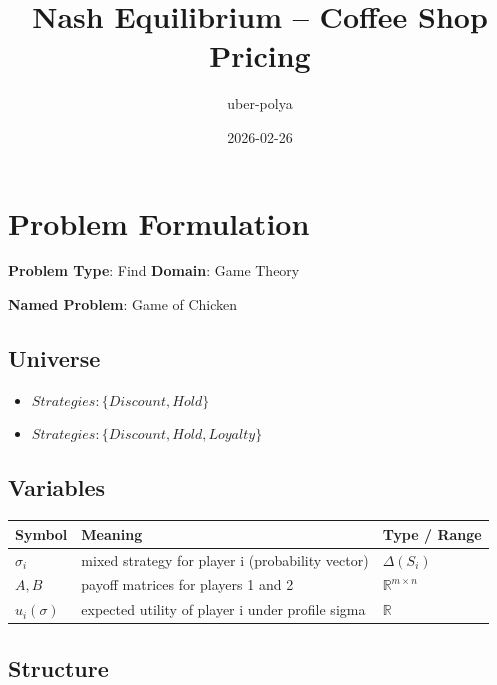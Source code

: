 \documentclass[11pt, a4paper]{article}
\title{Nash Equilibrium -- Coffee Shop Pricing}
\author{uber-polya}
\date{2026-02-26}
\begin{document}
\maketitle
\tableofcontents
\newpage

\section{Problem Formulation}

\begin{polyamodel}

\textbf{Problem Type}: Find \hfill
\textbf{Domain}: Game Theory

\textbf{Named Problem}: Game of Chicken

\end{polyamodel}

\subsection{Universe}

\begin{itemize}
  \item $Strategies: \{Discount, Hold\}$
  \item $Strategies: \{Discount, Hold, Loyalty\}$
\end{itemize}

\subsection{Variables}

\begin{longtable}{lll}
\toprule
\textbf{Symbol} & \textbf{Meaning} & \textbf{Type / Range} \\
\midrule
\endhead
$\sigma_i$ & mixed strategy for player i (probability vector) & $\Delta(S_i)$ \\
$A, B$ & payoff matrices for players 1 and 2 & $\mathbb{R}^{m \times n}$ \\
$u_i(\sigma)$ & expected utility of player i under profile sigma & $\mathbb{R}$ \\
\bottomrule
\end{longtable}

\subsection{Structure}
\end{document}
